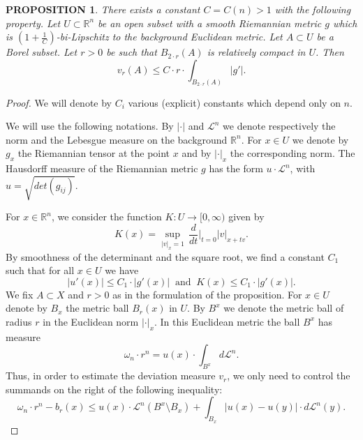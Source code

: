 \documentclass[12pt,leqno,intlimits]{amsart}
\numberwithin{equation}{section}
\newtheorem{prop}[thm]{PROPOSITION}
\theoremstyle{definition}
\theoremstyle{remark}
\newcommand{\R}{\mathbb{R}}
\def\:{\colon}
\begin{document}
\begin{prop}\label{prop-smooth}
There exists a constant $C=C(n)>1$ with the following property.
Let $U\subset \R^n$ be an open subset with a smooth Riemannian
metric $g$ which is $(1+\frac 1 C)$-bi-Lipschitz to the background Euclidean metric.
Let $A\subset U$ be a Borel subset. Let $r>0$ be such that $B_{2{\cdot}r} (A)$ is relatively compact in $U$.
Then 
$$v_r (A) \leq C \cdot r \cdot \int _{B_{2{\cdot}r} ( A)} |g' |.$$
\end{prop}

\begin{proof}
We will denote by $C_i$ various (explicit) constants which depend only on $n$.

We will use the following notations. By $|\cdot|$ and $\mathcal L^n$ we denote respectively the norm and the Lebesgue measure on the background $\R^n$.
For $x\in U$ we denote by $g_x$ the Riemannian tensor at the point $x$ and
by $|\cdot |_x$ the corresponding norm. %
The Hausdorff measure of the Riemannian metric
$g$ has the form $u\cdot \mathcal L^n$, with $u=\sqrt {det (g_{ij})}$.

For $x\in \R^n$, we consider the function $K \:U\to [0,\infty)$ given by
$$K (x)=\sup _{|v|_x =1}\, \frac d {dt}\Big |_{t=0} |v| _{x+tv}.$$
By smoothness of the determinant and the square root,
we find a constant $C_1$ such that for all $x\in U$ we have
\begin{equation} \label{eq:Kg}
|u' (x)| \leq C_1\cdot |g' (x)| \; \; \text{and} \; \; K (x) \leq C_1 \cdot |g' (x)|.
\end{equation}
We fix $A\subset X$ and $r>0$ as in the formulation of the proposition. For $x\in U$ denote by $B_x$
the metric ball $B_r(x)$ in $U$. By $B^x$ we denote the metric ball of radius $r$ in the Euclidean norm $|\cdot |_x$. In this Euclidean metric the ball $B^x$ has measure
$$\omega _n\cdot r^n =u(x)\cdot \int _{B^x} d\mathcal L^n.$$
Thus, in order to estimate the deviation measure $v_r$, we only need to control the summands on the right of the following inequality:
\begin{equation} \label{eq:summand}
\omega_n \cdot r^n - b_r (x) \leq u(x) \cdot \mathcal L^n( B^x\setminus B_x) + \int _{B_x} |u(x)- u(y)| \cdot
d\mathcal L^n (y).
\end{equation}


\end{proof}
\end{document}
